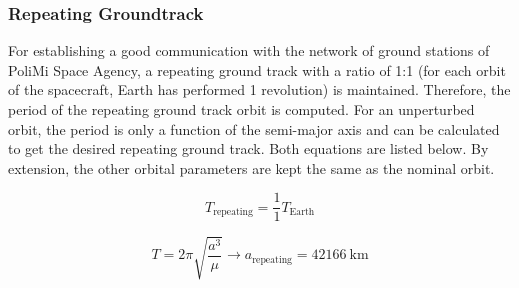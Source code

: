 \documentclass{article}
\begin{document}

\subsubsection{Repeating Groundtrack}


For establishing a good communication with the network of ground stations of PoliMi Space Agency, a repeating ground track with a ratio of 1:1 (for each orbit of the spacecraft, Earth has performed 1 revolution) is maintained. Therefore, the period of the repeating ground track orbit is computed. For an unperturbed orbit, the period is only a function of the semi-major axis and can be calculated to get the desired repeating ground track. Both equations are listed below. By extension, the other orbital parameters are kept the same as the nominal orbit. 

	
\begin{equation*}
	T_{\text{repeating}} = \frac{1}{1} T_{\text{Earth}}
\end{equation*}

\begin{equation*}
	T = 2\pi \sqrt{\frac{a^3}{\mu}} \rightarrow a_{\text{repeating}} = \SI{42166}{\kilo\meter}
\end{equation*} 
\end{document}
